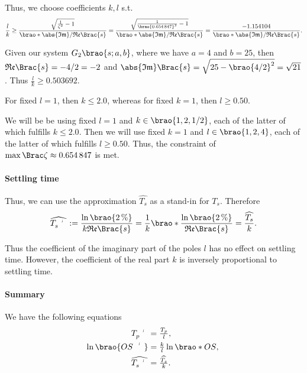 \documentclass[11pt]{article}
\begin{document}
\begin{adjustwidth}{0.5in}{0in}
        Thus, we choose coefficients \(k, l\) s.t.
        \[
            \frac{l}k
            \geq \frac{\sqrt{\frac1{\zeta^2} - 1}}{\brao*{\mathfrak{\abs{Im}/Re}}\Brac{s}}
            = \frac{\sqrt{\frac1{\brao{\num{0.654847}}^2} - 1}}{\brao*{\mathfrak{\abs{Im}/Re}}\Brac{s}}
            = \frac
                {-1.154104}
                {\brao*{\mathfrak{\abs{Im}/Re}}\Brac{s}}.
        \]

        Given our system \(G_2\brao{s; a, b}\), where we have
        \(a = 4\) and \(b = 25\), then \(
            \mathfrak{Re}\Brac{s} = -4/2 = -2
        \) and \(
            \abs{\mathfrak{Im}}\Brac{s} = \sqrt{25 - \brao{4/2}^2} = \sqrt{21}
        \). Thus \(\frac{l}k \geq \num{0.503692}\).

        For fixed \(l = 1\),
        then \(k \leq {2.0}\),
        whereas for fixed \(k = 1\),
        then \(l \geq {0.50}\).

        We will be be using fixed \(l = 1\)
        and \(k \in \brao{1, 2, 1/2}\),
        each of the latter of which fulfills \(k \leq 2.0\).
        Then we will use fixed \(k = 1\)
        and \(l \in \brao{1, 2, 4}\),
        each of the latter of which fulfills \(l \geq 0.50\). Thus, the constraint of \(\max\Brac\zeta \approx \num{0.654847}\) is met.

        \paragraph{Settling time}
        Thus, we can use the approximation \(\widehat{T_s}\) as a stand-in for \(T_s\). Therefore
        \[
            \widehat{\setprime{T}_s}
            := \frac{\ln\brao{\SI2\percent}}{k\mathfrak{Re}\Brac{s}}
            = \frac1k \brao*{\frac{\ln\brao{\SI2\percent}}{\mathfrak{Re}\Brac{s}}}
            = \frac{\widehat{T_s}}k.
        \]

        Thus the coefficient of the imaginary part of the poles \(l\) has no effect on settling time.
        However, the coefficient of the real part \(k\) is inversely proportional to settling time.

        \paragraph{Summary}
        We have the following equations
        \begin{eqnarray}
            \llap{\(
                \setprime{T}_p
            \)} = \rlap{\(
                \frac{T_p}l,
            \)}
        \\*
            \llap{\(
                \ln\brao{\setprime{OS}}
            \)} = \rlap{\(
                \frac{k}l\ln\brao*{OS},
            \)}
        \\*
            \llap{\(
                \widehat{\setprime{T}_s}
            \)} = \rlap{\(
                \frac{\widehat{T_s}}k.
            \)}
        \end{eqnarray}


\end{adjustwidth}
\end{document}
